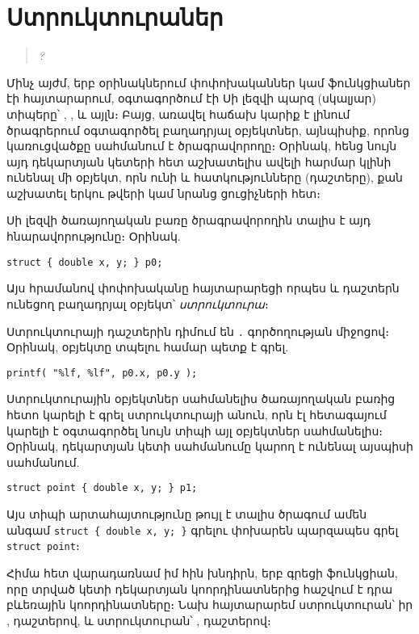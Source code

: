 \chapter{Ստրուկտուրաներ}

\begin{quote}
\emph{?}
\end{quote}

Մինչ այժմ, երբ օրինակներում փոփոխականներ կամ ֆունկցիաներ էի հայտարարում,
օգտագործում էի Սի լեզվի պարզ (սկալյար) տիպերը՝ , ,
 և այլն։ Բայց, առավել հաճախ կարիք է լինում ծրագրերում օգտագործել
բաղադրյալ օբյեկտներ, այնպիսիք, որոնց կառուցվածքը սահմանում է ծրագրավորողը։
Օրինակ, հենց նույն այդ դեկարտյան կետերի հետ աշխատելիս ավելի հարմար կլինի
ունենալ մի օբյեկտ, որն ունի  և  հատկությունները
(դաշտերը), քան աշխատել երկու  թվերի կամ նրանց ցուցիչների հետ։

Սի լեզվի  ծառայողական բառը ծրագրավորողին տալիս է այդ
հնարավորությունը։ Օրինակ.

\begin{Verbatim}
struct { double x, y; } p0;
\end{Verbatim}

Այս հրամանով  փոփոխականը հայտարարեցի որպես  և 
դաշտերն ունեցող բաղադրյալ օբյեկտ՝ \emph{ստրուկտուրա}։

Ստրուկտուրայի դաշտերին դիմում են \Verb|.| գործողության միջոցով։ Օրինակ,
 օբյեկտը տպելու համար պետք է գրել.

\begin{Verbatim}
printf( "%lf, %lf", p0.x, p0.y );
\end{Verbatim}

Ստրուկտուրային օբյեկտներ սահմանելիս  ծառայողական բառից հետո
կարելի է գրել ստրուկտուրայի անուն, որն էլ հետագայում կարելի է օգտագործել
նույն տիպի այլ օբյեկտներ սահմանելիս։ Օրինակ,  դեկարտյան կետի
սահմանումը կարող է ունենալ այսպիսի սահմանում.

\begin{Verbatim}
struct point { double x, y; } p1;
\end{Verbatim}

Այս տիպի արտահայտությունը թույլ է տալիս ծրագում ամեն անգամ
\texttt{struct \{ double x, y; \}} գրելու փոխարեն պարզապես գրել
\texttt{struct point}։

Հիմա հետ վարադառնամ իմ հին խնդիրն, երբ գրեցի  ֆունկցիան, որը
տրված կետի դեկարտյան կոորդինատներից հաշվում է դրա բևեռային կոորդինատները։
Նախ հայտարարեմ  ստրուկտուրան՝ իր ,
 դաշտերով, և  ստրուկտուրան՝ ,
 դաշտերով։

